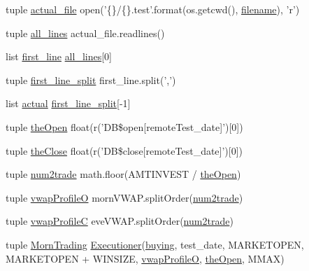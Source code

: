 \begin{DoxyCompactItemize}
\item 
tuple \hyperlink{namespacemain_a525425c50f2ffbe24b80ac781fd87ea4}{actual\-\_\-file} open('\{\}/\{\}.test'.format(os.\-getcwd(), \hyperlink{namespacemain_a50e2bb2c2453d804e5d6b3a5b74c1cf1}{filename}), 'r')
\item 
tuple \hyperlink{namespacemain_ad72f74668d86fda5048df035955479d9}{all\-\_\-lines} actual\-\_\-file.\-readlines()
\item 
list \hyperlink{namespacemain_ab5cb346125304206e92de6618c43315e}{first\-\_\-line} \hyperlink{namespacemain_ad72f74668d86fda5048df035955479d9}{all\-\_\-lines}\mbox{[}0\mbox{]}
\item 
tuple \hyperlink{namespacemain_a5d8df8cfa1e45c747b56adcb04a6cc16}{first\-\_\-line\-\_\-split} first\-\_\-line.\-split(',')
\item 
list \hyperlink{namespacemain_aefdbe12162b07e208468d2e45b949f7d}{actual} \hyperlink{namespacemain_a5d8df8cfa1e45c747b56adcb04a6cc16}{first\-\_\-line\-\_\-split}\mbox{[}-\/1\mbox{]}
\item 
tuple \hyperlink{namespacemain_a5ddde740f03e7759f7635b84f49c0cde}{the\-Open} float(r('D\-B\$open\mbox{[}remote\-Test\-\_\-date\mbox{]}')\mbox{[}0\mbox{]})
\item 
tuple \hyperlink{namespacemain_a7b7f8e1866fa939903d669eda1f85843}{the\-Close} float(r('D\-B\$close\mbox{[}remote\-Test\-\_\-date\mbox{]}')\mbox{[}0\mbox{]})
\item 
tuple \hyperlink{namespacemain_a118e0bd8e297ab3304833a9df0cec090}{num2trade} math.\-floor(A\-M\-T\-I\-N\-V\-E\-S\-T / \hyperlink{namespacemain_a5ddde740f03e7759f7635b84f49c0cde}{the\-Open})
\item 
tuple \hyperlink{namespacemain_adb71e21eddaadc4f2572762007577c68}{vwap\-Profile\-O} morn\-V\-W\-A\-P.\-split\-Order(\hyperlink{namespacemain_a118e0bd8e297ab3304833a9df0cec090}{num2trade})
\item 
tuple \hyperlink{namespacemain_a98bb2a52e5b44a9ceba4f520b3344bd8}{vwap\-Profile\-C} eve\-V\-W\-A\-P.\-split\-Order(\hyperlink{namespacemain_a118e0bd8e297ab3304833a9df0cec090}{num2trade})
\item 
tuple \hyperlink{namespacemain_ad5e5023cc95c9e2c194d60e014d06a70}{Morn\-Trading} \hyperlink{classexecutioner_1_1_executioner}{Executioner}(\hyperlink{namespacemain_ace774159e8fcc00c1958a240079dd5e2}{buying}, test\-\_\-date, M\-A\-R\-K\-E\-T\-O\-P\-E\-N, M\-A\-R\-K\-E\-T\-O\-P\-E\-N + W\-I\-N\-S\-I\-Z\-E, \hyperlink{namespacemain_adb71e21eddaadc4f2572762007577c68}{vwap\-Profile\-O}, \hyperlink{namespacemain_a5ddde740f03e7759f7635b84f49c0cde}{the\-Open}, M\-M\-A\-X)

\end{DoxyCompactItemize}
